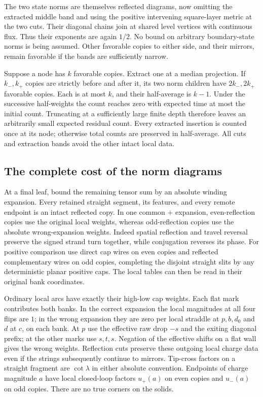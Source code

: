 The two state norms are themselves reflected diagrams, now omitting
the extracted middle band and using the positive intervening
square-layer metric at the two cuts.  Their diagonal chains join at
shared level vertices with continuous flux.  Thus their exponents
are again $1/2$.  No bound on arbitrary boundary-state norms is being
assumed.  Other favorable copies to either side, and their mirrors,
remain favorable if the bands are sufficiently narrow.

Suppose a node has $k$ favorable copies.  Extract one at a median
projection.  If $k_-,k_+$ copies are strictly before and after it, its
two norm children have $2k_-,2k_+$ favorable copies.  Each is at most
$k$, and their half-average is $k-1$.  Under the successive half-weights
the count reaches zero with expected time at most the initial count.
Truncating at a sufficiently large finite depth therefore leaves an
arbitrarily small expected residual count.  Every extracted insertion
is counted once at its node; otherwise total counts are preserved in
half-average.  All cuts and extraction bands avoid the other intact
local data.

\subsection{The complete cost of the norm diagrams}

At a final leaf, bound the remaining tensor sum by an absolute winding
expansion.  Every retained straight segment, its features, and every
remote endpoint is an intact reflected copy.  In one common $+$
expansion, even-reflection copies use the original local weights,
whereas odd-reflection copies use the absolute wrong-expansion
weights.  Indeed spatial reflection and travel reversal preserve the
signed strand turn together, while conjugation reverses its phase.
For positive comparison use direct cap wires on even copies and
reflected complementary wires on odd copies, completing the disjoint
straight slits by any deterministic planar positive caps.  The local
tables can then be read in their original bank coordinates.

Ordinary local arcs have exactly their high-low cap weights.  Each
flat mark contributes both banks.  In the correct expansion the local
magnitudes at all four flips are $1$; in the wrong expansion they are
zero per local straddle at $p,b,d_0$ and $d$ at $c$, on each bank.
At $p$ use the effective raw drop $-s$ and the exiting diagonal prefix;
at the other marks use $s,t,s$.  Negation of the effective shifts on
a flat wall gives the wrong weights.  Reflection cuts preserve these
outgoing local charge data even if the strings subsequently continue
to mirrors.  Tip-cross factors on a straight fragment are $\cot\lambda$
in either absolute convention.  Endpoints of charge magnitude $a$
have local closed-loop factors $u_+(a)$ on even copies and $u_-(a)$
on odd copies.  There are no true corners on the solids.

